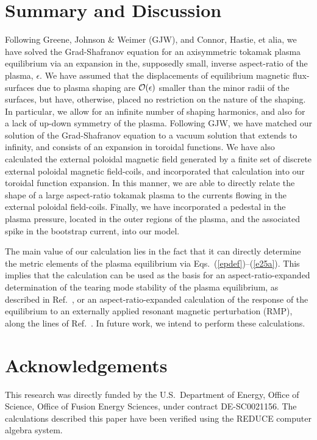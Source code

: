 \documentclass[12pt,prb,aps]{revtex4-1}
\begin{document}
\section{Summary and Discussion}\label{summary}
Following Greene, Johnson \& Weimer (GJW),\cite{greene} and Connor, Hastie, et alia,\cite{con0,con,gim,fitz93} we have solved the
Grad-Shafranov equation for an axisymmetric tokamak plasma equilibrium via an expansion in the, supposedly small,  inverse aspect-ratio of the plasma, $\epsilon$. 
We have assumed that the displacements of equilibrium magnetic flux-surfaces due to plasma shaping are ${\cal O}(\epsilon)$ smaller than the minor radii
of the surfaces, but have, otherwise, placed no restriction on the nature of the shaping. In particular, we allow for an infinite number
of shaping harmonics, and also for a lack of up-down symmetry of the plasma. Following GJW, we have matched our solution of the Grad-Shafranov
equation to a vacuum solution that extends to infinity, and consists of an expansion in toroidal functions. We have also calculated the external poloidal magnetic
field generated by a finite set of discrete external poloidal magnetic field-coils, and incorporated that calculation into our toroidal function expansion. 
In this manner, we are able to directly relate the shape of a large aspect-ratio tokamak plasma to the currents flowing in the external poloidal field-coils. 
Finally, we have  incorporated a pedestal in the plasma pressure, located in the outer regions of the plasma, and the associated spike in the bootstrap
current, into our model.  

The main value of our calculation lies in the fact that it can directly determine the metric elements of the plasma equilibrium
via Eqs.~(\ref{epdef})--(\ref{e25a}). This implies that the calculation can be used as the basis for an aspect-ratio-expanded determination 
of the tearing mode stability of the plasma equilibrium, as described in Ref.~, or an aspect-ratio-expanded 
calculation of the response of  the equilibrium to an externally applied resonant magnetic perturbation (RMP), along the lines of Ref.~. 
In future work, we intend to perform these calculations. 

\section*{Acknowledgements}
This research was directly funded by the U.S.\ Department of Energy, Office of Science, Office of Fusion Energy Sciences, under  contract DE-SC0021156. 
The calculations  described  this paper have been verified using the {\sc REDUCE} computer algebra system.
\end{document}
